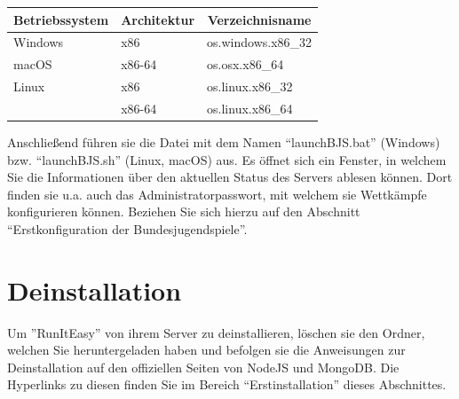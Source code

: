 \documentclass[11pt,a4paper,titlepage,german]{article}
\begin{document}
			\begin{center}
				\def\arraystretch{2}
				\begin{tabular}{ l | l | l }
					\multicolumn{1}{c}{\bfseries Betriebssystem} & \multicolumn{1}{c}{\bfseries Architektur} & \multicolumn{1}{c}{\bfseries Verzeichnisname} \\
					\hline
					Windows & x86 & os.windows.x86\_32 \\
					\hline
					macOS & x86-64 & os.osx.x86\_64 \\
					\hline
					Linux & x86 & os.linux.x86\_32 \\
					 & x86-64 & os.linux.x86\_64
				\end{tabular}
			\end{center}
			
			Anschließend führen sie die Datei mit dem Namen “launchBJS.bat” (Windows) bzw. “launchBJS.sh” (Linux, macOS) aus. Es öffnet sich ein Fenster, in welchem Sie die Informationen über den aktuellen Status des Servers ablesen können. Dort finden sie u.a. auch das Administratorpasswort, mit welchem sie Wettkämpfe konfigurieren können. Beziehen Sie sich hierzu auf den Abschnitt “Erstkonfiguration der Bundesjugendspiele”.
			
		\section{Deinstallation}
			Um ''RunItEasy'' von ihrem Server zu deinstallieren, löschen sie den Ordner, welchen Sie heruntergeladen haben und befolgen sie die Anweisungen zur Deinstallation auf den offiziellen Seiten von NodeJS und MongoDB. Die Hyperlinks zu diesen finden Sie im Bereich “Erstinstallation” dieses Abschnittes.
		
	\newpage
		
\end{document}
